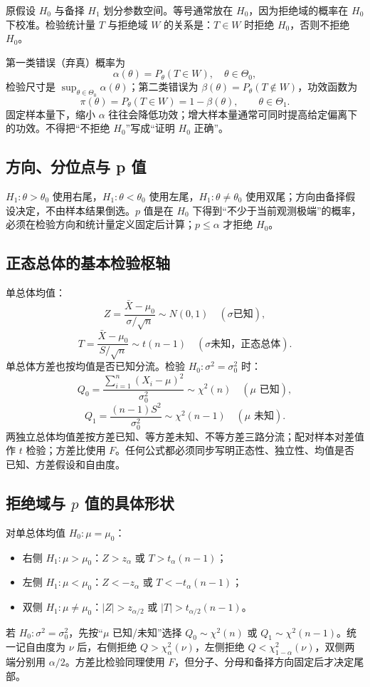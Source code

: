 \documentclass[11pt,a4paper]{ctexart}
\begin{document}
原假设 $H_0$ 与备择 $H_1$ 划分参数空间。等号通常放在 $H_0$，因为拒绝域的概率在 $H_0$ 下校准。检验统计量 $T$ 与拒绝域 $W$ 的关系是：$T\in W$ 时拒绝 $H_0$，否则不拒绝 $H_0$。

第一类错误（弃真）概率为
\[
\alpha(\theta)=P_\theta(T\in W),\quad \theta\in\Theta_0,
\]
检验尺寸是 $\sup_{\theta\in\Theta_0}\alpha(\theta)$；第二类错误为 $\beta(\theta)=P_\theta(T\notin W)$，功效函数为
\[
\pi(\theta)=P_\theta(T\in W)=1-\beta(\theta),\qquad \theta\in\Theta_1.
\]
固定样本量下，缩小 $\alpha$ 往往会降低功效；增大样本量通常可同时提高给定偏离下的功效。不得把“不拒绝 $H_0$”写成“证明 $H_0$ 正确”。

\subsection{方向、分位点与 p 值}

$H_1:\theta>\theta_0$ 使用右尾，$H_1:\theta<\theta_0$ 使用左尾，$H_1:\theta\ne\theta_0$ 使用双尾；方向由备择假设决定，不由样本结果倒选。$p$ 值是在 $H_0$ 下得到“不少于当前观测极端”的概率，必须在检验方向和统计量定义固定后计算；$p\leq\alpha$ 才拒绝 $H_0$。

\subsection{正态总体的基本检验枢轴}

单总体均值：
\[
Z=\frac{\bar X-\mu_0}{\sigma/\sqrt n}\sim N(0,1)\quad(\sigma\text{已知}),
\]
\[
T=\frac{\bar X-\mu_0}{S/\sqrt n}\sim t(n-1)\quad(\sigma\text{未知，正态总体}).
\]
单总体方差也按均值是否已知分流。检验 $H_0:\sigma^2=\sigma_0^2$ 时：
\[
Q_0=\frac{\sum_{i=1}^n(X_i-\mu)^2}{\sigma_0^2}\sim\chi^2(n)
\quad(\mu\text{ 已知}),
\]
\[
Q_1=\frac{(n-1)S^2}{\sigma_0^2}\sim\chi^2(n-1)
\quad(\mu\text{ 未知}).
\]
两独立总体均值差按方差已知、等方差未知、不等方差三路分流；配对样本对差值作 $t$ 检验；方差比使用 $F$。任何公式都必须同步写明正态性、独立性、均值是否已知、方差假设和自由度。

\subsection{拒绝域与 $p$ 值的具体形状}

对单总体均值 $H_0:\mu=\mu_0$：
\begin{itemize}
  \item 右侧 $H_1:\mu>\mu_0$：$Z>z_\alpha$ 或 $T>t_\alpha(n-1)$；
  \item 左侧 $H_1:\mu<\mu_0$：$Z<-z_\alpha$ 或 $T<-t_\alpha(n-1)$；
  \item 双侧 $H_1:\mu\ne\mu_0$：$\lvert Z\rvert>z_{\alpha/2}$ 或 $\lvert T\rvert>t_{\alpha/2}(n-1)$。
\end{itemize}
若 $H_0:\sigma^2=\sigma_0^2$，先按“$\mu$ 已知/未知”选择 $Q_0\sim\chi^2(n)$ 或 $Q_1\sim\chi^2(n-1)$。统一记自由度为 $\nu$ 后，右侧拒绝 $Q>\chi^2_\alpha(\nu)$，左侧拒绝 $Q<\chi^2_{1-\alpha}(\nu)$，双侧两端分别用 $\alpha/2$。方差比检验同理使用 $F$，但分子、分母和备择方向固定后才决定尾部。
\end{document}

